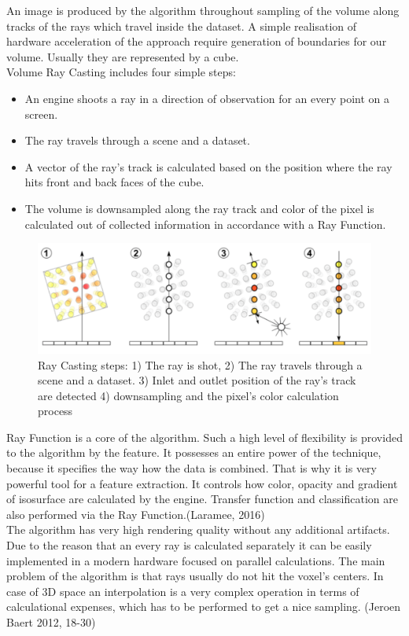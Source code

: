 \documentclass[twoside, english, 11pt]{report}
\begin{document}
An image is produced by the algorithm throughout sampling of the volume along tracks of the rays which travel inside the dataset. A simple realisation of hardware acceleration of the approach require generation of boundaries for our volume. Usually they are represented by a cube.\\

Volume Ray Casting includes four simple steps:
\begin{itemize} \item An engine shoots a ray in a direction of observation for an every point on a screen.
\item The ray travels through a scene and a dataset.
\item A vector of the ray's track is calculated based on the position where the ray hits front and back faces of the cube.
\item The volume is downsampled along the ray track and color of the pixel is calculated out of collected information in accordance with a Ray Function.
\end{itemize}
\begin{figure}[!h]
\centerline{\includegraphics[scale=0.35]{img/rayCast}}
\caption{Ray Casting steps: 1) The ray is shot, 2) The ray travels through a scene and a dataset. 3) Inlet and outlet position of the ray's track are detected 4) downsampling and the pixel's color calculation process}
\end{figure}

Ray Function is a core of the algorithm. Such a high level of flexibility is provided to the algorithm by the feature. It possesses an entire power of the technique, because it specifies the way how the data is combined. That is why it is very powerful tool for a feature extraction. It controls how color, opacity and gradient of isosurface are calculated by the engine. Transfer function and classification are also performed via the Ray Function.(Laramee, 2016)\\

The algorithm has very high rendering quality without any additional artifacts. Due to the reason that an every ray is calculated separately it can be easily implemented in a modern hardware focused on parallel calculations. The main problem of the algorithm is that rays usually do not hit the voxel's centers. In case of 3D space an interpolation is a very complex operation in terms of calculational expenses, which has to be performed to get a nice sampling. (Jeroen Baert 2012, 18-30)
\end{document}
